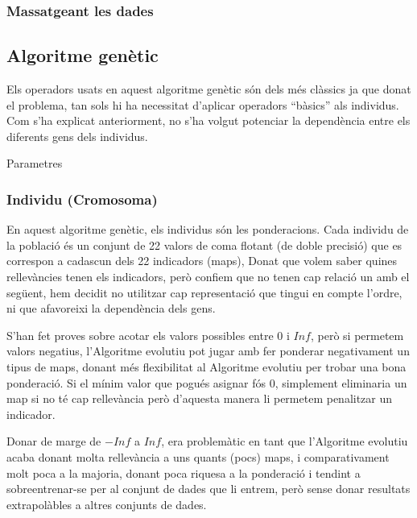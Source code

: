 \documentclass[titlepage,a4paper,12pt]{book}
\begin{document}
\subsubsection{Massatgeant les dades} %
\label{ssub:Massatgeant les dades}



\subsection{Algoritme genètic} %
\label{sub:genetic}

Els operadors usats en aquest algoritme genètic són dels més clàssics ja que
donat el problema, tan sols hi ha necessitat d'aplicar operadors ``bàsics'' als
individus.  Com s'ha explicat anteriorment, no s'ha volgut potenciar la
dependència entre els diferents gens dels individus.

Parametres

\subsubsection{Individu (Cromosoma)}
\label{ssub:individu (cromosoma)}

En aquest algoritme genètic, els individus són les ponderacions.  Cada individu
de la població és un conjunt de 22 valors de coma flotant (de doble precisió)
que es correspon a cadascun dels 22 indicadors (maps),  Donat que volem saber
quines rellevàncies tenen els indicadors, però confiem que no tenen cap relació
un amb el següent, hem decidit no utilitzar cap representació que tingui en
compte l'ordre, ni que afavoreixi la dependència dels gens. %

S'han fet proves sobre acotar els valors possibles entre 0 i $Inf$, però si
permetem valors negatius, l'Algoritme evolutiu pot jugar amb fer ponderar
negativament un tipus de maps, donant més flexibilitat al Algoritme evolutiu per
trobar una bona ponderació.  Si el mínim valor que pogués asignar fós 0,
simplement eliminaria un map si no té cap rellevància però d'aquesta manera li
permetem penalitzar un indicador.

Donar de marge de $-Inf$ a $Inf$, era problemàtic en tant que l'Algoritme
evolutiu acaba donant molta rellevància a uns quants (pocs) maps, i
comparativament molt poca a la majoria, donant poca riquesa a la ponderació i
tendint a sobreentrenar-se per al conjunt de dades que li entrem, però sense
donar resultats extrapolàbles a altres conjunts de dades.
\end{document}
